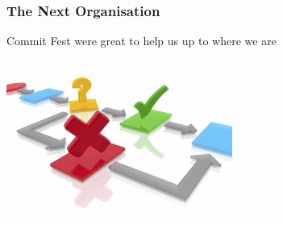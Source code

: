 \documentclass{beamer}
\begin{document}
\begin{frame}
  \frametitle{The Next Organisation}

  \begin{center}
    Commit Fest were great to help us up to where we are
    \vfill
    \includegraphics[height=15em]{workflow.jpg}
  \end{center}
\end{frame}

\end{document}
